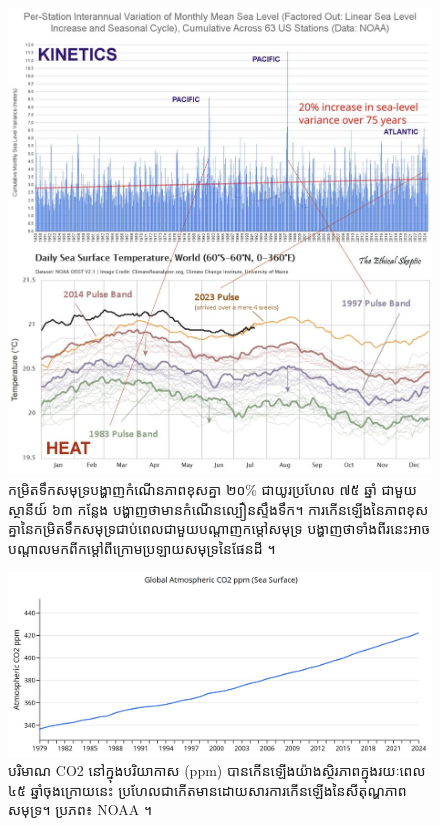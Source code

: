 \documentclass[10pt,twocolumn,letterpaper]{article}
\begin{document}
\begin{figure}[t]
\begin{center}
\includegraphics[width=1\textwidth]{sealevel.jpeg}
\end{center}
   \caption{កម្រិត​ទឹក​សមុទ្រ​បង្ហាញ​កំណើន​ភាពខុសគ្នា ២០\% ជាយូរប្រហែល ៧៥ ឆ្នាំ ជាមួយស្ថានីយ៍ ៦៣ កន្លែង បង្ហាញថាមានកំណើនល្បឿនស្ទឹងទឹក។ ការកើនឡើងនៃភាពខុសគ្នានៃកម្រិតទឹកសមុទ្រជាប់ពេលជាមួយបណ្តាញកម្ដៅសមុទ្រ បង្ហាញថាទាំងពីរនេះអាចបណ្តាលមកពីកម្ដៅពីក្រោមប្រឡាយសមុទ្រនៃផែនដី \cite{2,129}។}
\label{fig:22}
\end{figure}

\begin{figure}[t]
\begin{center}
\includegraphics[width=1\textwidth]{co2.jpg}
\end{center}
   \caption{បរិមាណ CO2 នៅក្នុងបរិយាកាស (ppm) បានកើនឡើងយ៉ាងស្ថិរភាពក្នុងរយៈពេល ៤៥ ឆ្នាំចុងក្រោយនេះ ប្រហែលជាកើតមានដោយសារការកើនឡើងនៃសីតុណ្ហភាពសមុទ្រ។ ប្រភព៖ NOAA \cite{148,129}។}
\label{fig:23}
\end{figure}
\end{document}
